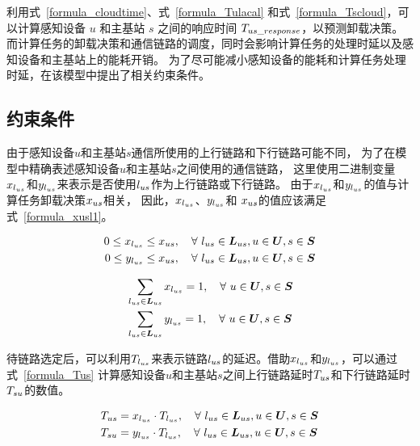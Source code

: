 利用式~\eqref{formula_cloudtime}、式~\eqref{formula_Tulacal} 和式~\eqref{formula_Tscloud}，可以计算感知设备 $u$ 和主基站 $s$ 之间的响应时间 ${T}_{us\_response}$，以预测卸载决策。
而计算任务的卸载决策和通信链路的调度，同时会影响计算任务的处理时延以及感知设备和主基站上的能耗开销。
为了尽可能减小感知设备的能耗和计算任务处理时延，在该模型中提出了相关约束条件。

\subsection{约束条件}
\label{Constraints}

由于感知设备$u$和主基站$s$通信所使用的上行链路和下行链路可能不同，
为了在模型中精确表述感知设备$u$和主基站$s$之间使用的通信链路，
这里使用二进制变量$x_{l_{us}}$和$y_{l_{us}}$来表示是否使用$l_{us}$作为上行链路或下行链路。
由于$x_{l_{us}}$和$y_{l_{us}}$的值与计算任务卸载决策${x}_{us}$相关，
因此，$x_{l_{us}}$、$y_{l_{us}}$和 ${x}_{us}$的值应该满足式~\eqref{formula_xusl1}。


\begin{equation}
\label{formula_xusl}
\begin{aligned}
0 \leq x_{l_{us}} \leq {x}_{us}, \quad \forall \ l_{us} \in \boldsymbol{L}_{us}, u\in \boldsymbol{U}, s\in \boldsymbol{S}\\
0 \leq y_{l_{us}} \leq {x}_{us}, \quad \forall \ l_{us} \in \boldsymbol{L}_{us}, u\in \boldsymbol{U}, s\in \boldsymbol{S}\\
\end{aligned}
\end{equation}

\begin{equation}
\label{formula_xusl1}
\begin{aligned}
&\sum_{l_{us} \in \boldsymbol{L}_{us}}x_{l_{us}} = 1, \quad \forall \ u\in \boldsymbol{U}, s\in \boldsymbol{S}\\
&\sum_{l_{us} \in \boldsymbol{L}_{us}}y_{l_{us}} = 1, \quad \forall \ u\in \boldsymbol{U}, s\in \boldsymbol{S}\\
\end{aligned}
\end{equation}

待链路选定后，可以利用$T_{l_{us}}$来表示链路$l_{us}$的延迟。借助$x_{l_{us}}$和$y_{l_{us}}$，可以通过式~\eqref{formula_Tus} 计算感知设备$u$和主基站$s$之间上行链路延时${T}_{us}$和下行链路延时${T}_{su}$的数值。

\begin{equation}
\label{formula_Tus}
\begin{aligned}
&{T}_{us} = x_{l_{us}} \cdot T_{l_{us}}, \quad \forall \ l_{us} \in \boldsymbol{L}_{us}, u\in \boldsymbol{U}, s\in \boldsymbol{S}\\
&{T}_{su} = y_{l_{us}} \cdot T_{l_{us}}, \quad \forall \ l_{us} \in \boldsymbol{L}_{us}, u\in \boldsymbol{U}, s\in \boldsymbol{S}\\
\end{aligned}
\end{equation}

